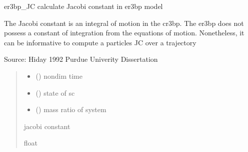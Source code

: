 \documentclass[letterpaper,10pt,english]{sphinxmanual}
\begin{document}

\begin{fulllineitems}
\label{\detokenize{models:pyraa.models.er3bp_JC}}
\pysigstartsignatures
{}
\pysigstopsignatures
\sphinxAtStartPar
er3bp\_JC \sphinxhyphen{} calculate Jacobi constant in er3bp model

\sphinxAtStartPar
The Jacobi constant is an integral of motion in the cr3bp.
The er3bp does not possess a constant of integration from the
equations of motion. Nonetheless, it can be informative to compute
a particles JC over a trajectory

\sphinxAtStartPar
Source: Hiday 1992 Purdue Univerity Dissertation
\begin{quote}\begin{description}
\begin{itemize}
\item {} 
\sphinxAtStartPar
{} () \sphinxhyphen{}\sphinxhyphen{} non\sphinxhyphen{}dim time

\item {} 
\sphinxAtStartPar
{} () \sphinxhyphen{}\sphinxhyphen{} state of sc

\item {} 
\sphinxAtStartPar
{} () \sphinxhyphen{}\sphinxhyphen{} mass ratio of system

\end{itemize}

\sphinxAtStartPar
{} \sphinxhyphen{}\sphinxhyphen{} jacobi constant

\sphinxAtStartPar
float

\end{description}\end{quote}

\end{fulllineitems}
\end{document}
